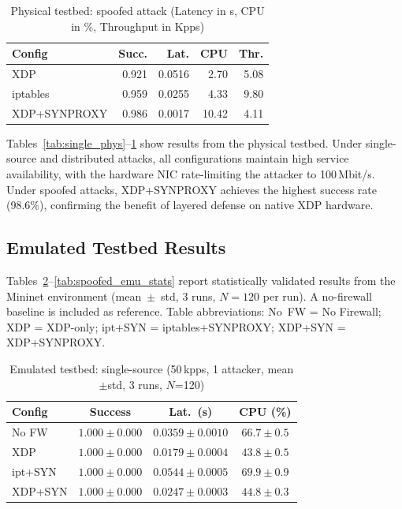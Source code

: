 \documentclass[conference]{IEEEtran}
\begin{document}
\begin{table}[h]
\centering
\caption{Physical testbed: spoofed attack
(Latency in s, CPU in \%, Throughput in Kpps)}
\label{tab:spoofed_phys}
\small
\begin{tabular}{|l|r|r|r|r|}
\hline
\textbf{Config} & \textbf{Succ.} & \textbf{Lat.} &
\textbf{CPU} & \textbf{Thr.} \\
\hline
XDP          & 0.921 & 0.0516 &  2.70 & 5.08 \\
iptables     & 0.959 & 0.0255 &  4.33 & 9.80 \\
XDP+SYNPROXY & 0.986 & 0.0017 & 10.42 & 4.11 \\
\hline
\end{tabular}
\end{table}

Tables~\ref{tab:single_phys}--\ref{tab:spoofed_phys} show results from
the physical testbed.
Under single-source and distributed attacks, all configurations maintain
high service availability, with the hardware NIC rate-limiting the attacker
to 100\,Mbit/s.
Under spoofed attacks, XDP+SYNPROXY achieves the highest success rate
(98.6\%), confirming the benefit of layered defense on native XDP hardware.

\subsection{Emulated Testbed Results}

Tables~\ref{tab:single_emu_stats}--\ref{tab:spoofed_emu_stats} report
statistically validated results from the Mininet environment
(mean~$\pm$~std, 3 runs, $N=120$ per run).
A no-firewall baseline is included as reference.
Table abbreviations: No~FW = No Firewall; XDP = XDP-only;
ipt+SYN = iptables+SYNPROXY; XDP+SYN = XDP+SYNPROXY.

\begin{table}[h]
\centering
\caption{Emulated testbed: single-source (50\,kpps, 1 attacker,
mean$\pm$std, 3 runs, $N$=120)}
\label{tab:single_emu_stats}
\footnotesize
\setlength{\tabcolsep}{4pt}
\begin{tabular}{|l|c|c|c|}
\hline
\textbf{Config} & \textbf{Success} & \textbf{Lat.\ (s)} &
\textbf{CPU (\%)} \\
\hline
No FW   & $1.000{\pm}0.000$ & $0.0359{\pm}0.0010$ & $66.7{\pm}0.5$ \\
XDP     & $1.000{\pm}0.000$ & $0.0179{\pm}0.0004$ & $43.8{\pm}0.5$ \\
ipt+SYN & $1.000{\pm}0.000$ & $0.0544{\pm}0.0005$ & $69.9{\pm}0.9$ \\
XDP+SYN & $1.000{\pm}0.000$ & $0.0247{\pm}0.0003$ & $44.8{\pm}0.3$ \\
\hline
\end{tabular}
\end{table}
\end{document}
